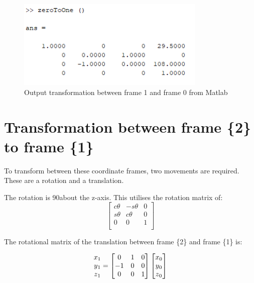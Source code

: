 \documentclass [11pt]{report}
\begin{document}
\begin{figure}[H]
\centerline{\includegraphics[width=9cm]{zeroToOneoutput.png}}
\caption{Output transformation between frame 1 and frame 0 from Matlab}
\label{fig}
\end{figure}

\section{Transformation between frame \{2\}\, to frame \{1\}}

To transform between these coordinate frames, two movements are required. These are a rotation and a translation.

The rotation is 90{\degree}about the z-axis. This utilises the rotation matrix of: 
$$
\begin{bmatrix}
c{\theta}&-s{\theta}&0\\
s{\theta}&c{\theta}&0\\
0&0&1\\
\end{bmatrix}
$$

The rotational matrix of the translation between frame \{2\} and frame \{1\} is:

\begin{equation*}
\begin{matrix}
x\textsubscript{1}\\
y\textsubscript{1}\\
z\textsubscript{1}\\
\end{matrix}
= 
\begin{bmatrix}
0&1&0\\
-1&0&0\\
0&0&1\\
\end{bmatrix}
\begin{bmatrix}
x\textsubscript{0}\\
y\textsubscript{0}\\
z\textsubscript{0}\\
\end{bmatrix}
\end{equation*}
\end{document}
